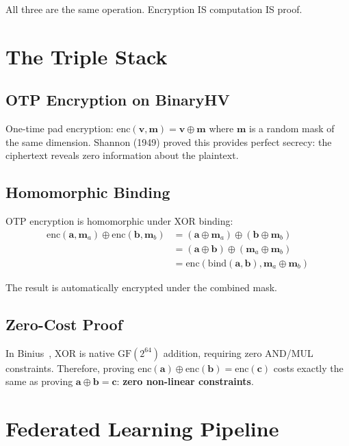 \documentclass[11pt]{article}
\begin{document}
All three are the same operation. Encryption IS computation IS proof.

\section{The Triple Stack}

\subsection{OTP Encryption on BinaryHV}

One-time pad encryption: $\mathrm{enc}(\mathbf{v}, \mathbf{m}) = \mathbf{v} \oplus \mathbf{m}$ where $\mathbf{m}$ is a random mask of the same dimension. Shannon (1949) proved this provides perfect secrecy: the ciphertext reveals zero information about the plaintext.

\subsection{Homomorphic Binding}

OTP encryption is homomorphic under XOR binding:
\begin{align}
\mathrm{enc}(\mathbf{a}, \mathbf{m}_a) \oplus \mathrm{enc}(\mathbf{b}, \mathbf{m}_b)
&= (\mathbf{a} \oplus \mathbf{m}_a) \oplus (\mathbf{b} \oplus \mathbf{m}_b) \\
&= (\mathbf{a} \oplus \mathbf{b}) \oplus (\mathbf{m}_a \oplus \mathbf{m}_b) \\
&= \mathrm{enc}(\mathrm{bind}(\mathbf{a}, \mathbf{b}), \mathbf{m}_a \oplus \mathbf{m}_b)
\end{align}

The result is automatically encrypted under the combined mask.

\subsection{Zero-Cost Proof}

In Binius~\cite{diamond2023binius}, XOR is native $\mathrm{GF}(2^{64})$ addition, requiring zero AND/MUL constraints. Therefore, proving $\mathrm{enc}(\mathbf{a}) \oplus \mathrm{enc}(\mathbf{b}) = \mathrm{enc}(\mathbf{c})$ costs exactly the same as proving $\mathbf{a} \oplus \mathbf{b} = \mathbf{c}$: \textbf{zero non-linear constraints}.

\section{Federated Learning Pipeline}
\end{document}
